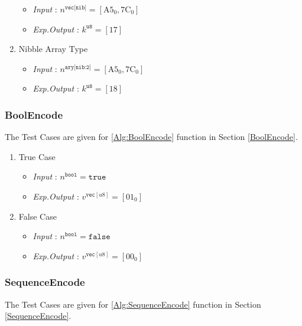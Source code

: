 \documentclass[../alan-handbook.tex]{subfiles}
\begin{document}
\begin{enumerate}
        \begin{itemize}
            \item \textit{Input} : $n^{\texttt{vec[nib]}} = [\text{A5}_0,\text{7C}_0]$
            \item \textit{Exp.Output} : $k^{\texttt{u8}} = [\text{17}]$
        \end{itemize}
    \item Nibble Array Type
        \begin{itemize}
            \item \textit{Input} : $n^{\texttt{ary[nib:2]}} = [\text{A5}_0,\text{7C}_0] $
            \item \textit{Exp.Output} : $k^{\texttt{u8}} = [\text{18}]$
        \end{itemize}
\end{enumerate}

\subsubsection{BoolEncode} \label{Test:BoolEncode}

The Test Cases are given for  \ref{Alg:BoolEncode} function in Section \ref{BoolEncode}.

\begin{enumerate}
    \item True Case 
        \begin{itemize}
            \item \textit{Input} : $n^{\texttt{bool}} = \texttt{true}$
            \item \textit{Exp.Output} : $v^{\texttt{vec}[u8]} = [\text{01}_0]$
        \end{itemize}
    \item False Case
        \begin{itemize}
            \item \textit{Input} : $n^{\texttt{bool}} = \texttt{false}$
            \item \textit{Exp.Output} : $v^{\texttt{vec}[u8]} = [\text{00}_0]$
        \end{itemize}
\end{enumerate}


\subsubsection{SequenceEncode} \label{Test:SequenceEncode}

The Test Cases are given for  \ref{Alg:SequenceEncode} function in Section \ref{SequenceEncode}.
\end{document}
